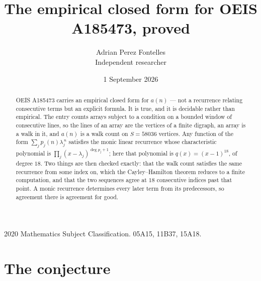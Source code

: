 \documentclass[11pt,a4paper]{article}
\title{The empirical closed form for OEIS A185473, proved}
\author{Adrian Perez Fontelles\\ \small Independent researcher}
\date{1 September 2026}
\theoremstyle{plain}
\theoremstyle{definition}
\begin{document}
\maketitle

\begin{abstract}
OEIS A185473 carries an empirical closed form for $a(n)$ --- not a recurrence relating
consecutive terms but an explicit formula. It is true, and it is decidable rather than
empirical. The entry counts arrays subject to a condition on a bounded window of consecutive lines, so the lines of an array are the
vertices of a finite digraph, an array is a walk in it, and $a(n)$ is a walk count on
$S=58036$ vertices. Any function of the form $\sum_j p_j(n)\lambda_j^{\,n}$ satisfies the
monic linear recurrence whose characteristic polynomial is
$\prod_j(x-\lambda_j)^{\deg p_j+1}$; here that polynomial is $q(x)=(x-1)^{18}$, of degree
$18$. Two things are then checked exactly: that the walk count satisfies the same
recurrence from some index on, which the Cayley--Hamilton theorem reduces to a finite
computation, and that the two sequences agree at $18$ consecutive indices past that
point. A monic recurrence determines every later term from its predecessors, so agreement
there is agreement for good.
\end{abstract}

\noindent\small 2020 Mathematics Subject Classification. 05A15, 11B37, 15A18.\normalsize

\section{The conjecture}
\end{document}
